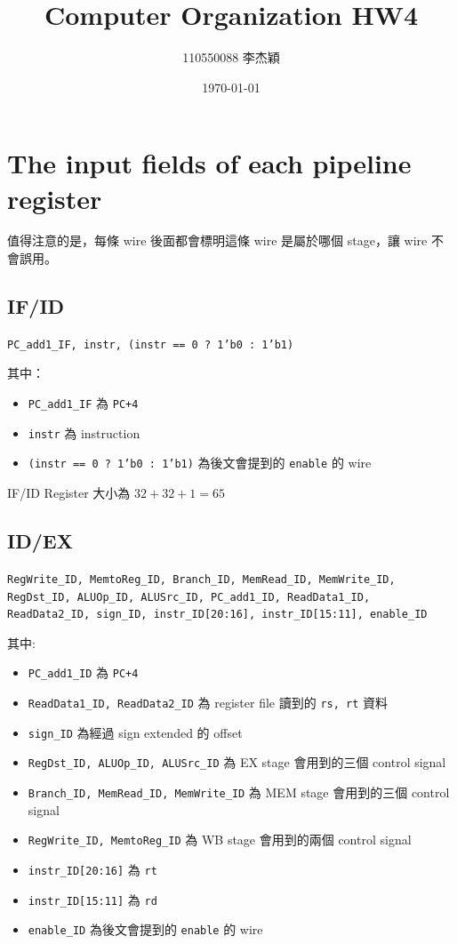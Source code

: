 \documentclass[twocolumn]{extarticle}
\title{Computer Organization HW4}
\author{110550088 李杰穎}
\date{\today}
\begin{document}
\maketitle



\section{The input fields of each pipeline register}

值得注意的是，每條 wire 後面都會標明這條 wire 是屬於哪個 stage，讓 wire 不會誤用。

\subsection{IF/ID}

\texttt{PC\_add1\_IF, instr, (instr == 0 ? 1'b0 : 1'b1)}

其中：
\begin{itemize}
\item \texttt{PC\_add1\_IF} 為 \texttt{PC+4}
\item \texttt{instr} 為 instruction
\item \texttt{(instr == 0 ? 1'b0 : 1'b1)} 為後文會提到的 \texttt{enable} 的 wire
\end{itemize}

IF/ID Register 大小為 $32+32+1 = 65$

\subsection{ID/EX}

\texttt{RegWrite\_ID, MemtoReg\_ID, Branch\_ID, MemRead\_ID, MemWrite\_ID, RegDst\_ID, ALUOp\_ID, ALUSrc\_ID, PC\_add1\_ID, ReadData1\_ID, ReadData2\_ID, sign\_ID, instr\_ID[20:16], instr\_ID[15:11], enable\_ID}

其中:
\begin{itemize}
\item \texttt{PC\_add1\_ID} 為 \texttt{PC+4}
\item \texttt{ReadData1\_ID, ReadData2\_ID} 為 register file 讀到的 \texttt{rs, rt} 資料
\item \texttt{sign\_ID} 為經過 sign extended 的 offset
\item \texttt{RegDst\_ID, ALUOp\_ID, ALUSrc\_ID} 為 EX stage 會用到的三個 control signal
\item \texttt{Branch\_ID, MemRead\_ID, MemWrite\_ID} 為 MEM stage 會用到的三個 control signal
\item \texttt{RegWrite\_ID, MemtoReg\_ID}  為 WB stage 會用到的兩個 control signal
\item \texttt{instr\_ID[20:16]} 為 \texttt{rt}
\item \texttt{instr\_ID[15:11]} 為 \texttt{rd}
\item \texttt{enable\_ID} 為後文會提到的 \texttt{enable} 的 wire
\end{itemize}
\end{document}

